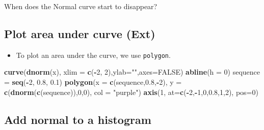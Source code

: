 \documentclass[]{article}
\newenvironment{Shaded}{\begin{snugshade}}{\end{snugshade}}
\newcommand{\DataTypeTok}[1]{\textcolor[rgb]{0.13,0.29,0.53}{#1}}
\newcommand{\DecValTok}[1]{\textcolor[rgb]{0.00,0.00,0.81}{#1}}
\newcommand{\FloatTok}[1]{\textcolor[rgb]{0.00,0.00,0.81}{#1}}
\newcommand{\KeywordTok}[1]{\textcolor[rgb]{0.13,0.29,0.53}{\textbf{#1}}}
\newcommand{\NormalTok}[1]{#1}
\newcommand{\OperatorTok}[1]{\textcolor[rgb]{0.81,0.36,0.00}{\textbf{#1}}}
\newcommand{\OtherTok}[1]{\textcolor[rgb]{0.56,0.35,0.01}{#1}}
\newcommand{\StringTok}[1]{\textcolor[rgb]{0.31,0.60,0.02}{#1}}
\providecommand{\tightlist}{%
  \setlength{\itemsep}{0pt}\setlength{\parskip}{0pt}}
\begin{document}
When does the Normal curve start to disappear?

\hypertarget{plot-area-under-curve-ext}{%
\subsection{Plot area under curve (Ext)}\label{plot-area-under-curve-ext}}

\begin{itemize}
\tightlist
\item
  To plot an area under the curve, we use \texttt{polygon}.
\end{itemize}

\begin{Shaded}
\begin{Highlighting}[]
\KeywordTok{curve}\NormalTok{(}\KeywordTok{dnorm}\NormalTok{(x), }\DataTypeTok{xlim =} \KeywordTok{c}\NormalTok{(}\OperatorTok{-}\DecValTok{2}\NormalTok{, }\DecValTok{2}\NormalTok{),}\DataTypeTok{ylab=}\StringTok{""}\NormalTok{,}\DataTypeTok{axes=}\OtherTok{FALSE}\NormalTok{)}
\KeywordTok{abline}\NormalTok{(}\DataTypeTok{h =} \DecValTok{0}\NormalTok{)}
\NormalTok{sequence =}\StringTok{ }\KeywordTok{seq}\NormalTok{(}\OperatorTok{-}\DecValTok{2}\NormalTok{, }\FloatTok{0.8}\NormalTok{, }\FloatTok{0.1}\NormalTok{)}
\KeywordTok{polygon}\NormalTok{(}\DataTypeTok{x =} \KeywordTok{c}\NormalTok{(sequence,}\FloatTok{0.8}\NormalTok{,}\OperatorTok{-}\DecValTok{2}\NormalTok{),}
        \DataTypeTok{y =} \KeywordTok{c}\NormalTok{(}\KeywordTok{dnorm}\NormalTok{(}\KeywordTok{c}\NormalTok{(sequence)),}\DecValTok{0}\NormalTok{,}\DecValTok{0}\NormalTok{),}
        \DataTypeTok{col =} \StringTok{"purple"}\NormalTok{)}
\KeywordTok{axis}\NormalTok{(}\DecValTok{1}\NormalTok{, }\DataTypeTok{at=}\KeywordTok{c}\NormalTok{(}\OperatorTok{-}\DecValTok{2}\NormalTok{,}\OperatorTok{-}\DecValTok{1}\NormalTok{,}\DecValTok{0}\NormalTok{,}\FloatTok{0.8}\NormalTok{,}\DecValTok{1}\NormalTok{,}\DecValTok{2}\NormalTok{), }\DataTypeTok{pos=}\DecValTok{0}\NormalTok{)}
\end{Highlighting}
\end{Shaded}

\hypertarget{add-normal-to-a-histogram}{%
\subsection{Add normal to a histogram}\label{add-normal-to-a-histogram}}

\begin{Shaded}
\end{Shaded}
\end{document}
